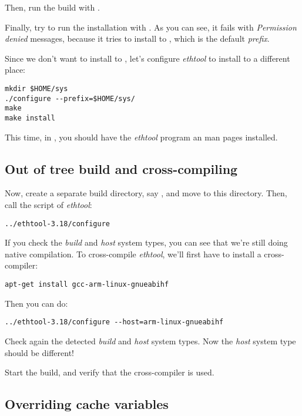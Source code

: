 Then, run the build with .

Finally, try to run the installation with . As you
can see, it fails with {\em Permission denied} messages, because it
tries to install to , which is the default {\em
  prefix}.

Since we don't want to install to , let's configure
{\em ethtool} to install to a different place:

\begin{verbatim}
mkdir $HOME/sys
./configure --prefix=$HOME/sys/
make
make install
\end{verbatim}

This time, in , you should have the {\em ethtool}
program an man pages installed.

\subsection{Out of tree build and cross-compiling}

Now, create a separate build directory, say
, and move to this
directory. Then, call the  script of {\em ethtool}:

\begin{verbatim}
../ethtool-3.18/configure
\end{verbatim}

If you check the {\em build} and {\em host} system types, you can see
that we're still doing native compilation. To cross-compile {\em
  ethtool}, we'll first have to install a cross-compiler:

\begin{verbatim}
apt-get install gcc-arm-linux-gnueabihf
\end{verbatim}

Then you can do:

\begin{verbatim}
../ethtool-3.18/configure --host=arm-linux-gnueabihf
\end{verbatim}

Check again the detected {\em build} and {\em host} system types. Now
the {\em host} system type should be different!

Start the build, and verify that the cross-compiler is used.

\subsection{Overriding cache variables}

